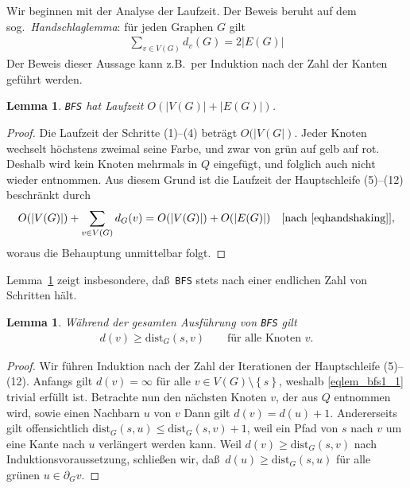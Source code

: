 \documentclass[10pt,reqno]{amsart}
\numberwithin{equation}{section}
\newtheorem{lemma}[definition]{Lemma}
\newcommand\dist{\mathrm{dist}}
\newcommand\cbc[1]{\left\{{#1}\right\}}
\newcommand\Lem{Lemma}
\begin{document}
Wir beginnen mit der Analyse der Laufzeit.
Der Beweis beruht auf dem sog.\ {\em Handschlaglemma}: f\"ur jeden Graphen $G$ gilt
\begin{align}\label{eqhandshaking}
	\sum_{v\in V(G)}d_v(G)=2|E(G)|
\end{align}
Der Beweis dieser Aussage kann z.B.\ per Induktion nach der Zahl der Kanten gef\"uhrt werden.

\begin{lemma}\label{lem_bfs0}
	{\tt BFS} hat Laufzeit $O(|V(G)|+|E(G)|)$.
\end{lemma}
\begin{proof}
	Die Laufzeit der Schritte (1)--(4) betr\"agt $O(|V(G|)$.
	Jeder Knoten wechselt h\"ochstens zweimal seine Farbe, und zwar von gr\"un auf gelb auf rot.
	Deshalb wird kein Knoten mehrmals in $Q$ eingef\"ugt, und folglich auch nicht wieder entnommen.
	Aus diesem Grund ist die Laufzeit der Hauptschleife (5)--(12) beschr\"ankt durch
	\begin{align*}
		O(|V(G)|)+\sum_{v\in V(G)}d_G(v)=O(|V(G)|)+O(|E(G)|)&&[\mbox{nach \eqref{eqhandshaking}}],
	\end{align*}
	woraus die Behauptung unmittelbar folgt.
\end{proof}

\Lem~\ref{lem_bfs0} zeigt insbesondere, da\ss\ {\tt BFS} stets nach einer endlichen Zahl von Schritten h\"alt.

\begin{lemma}\label{lem_bfs1}
	W\"ahrend der gesamten Ausf\"uhrung von {\tt BFS} gilt 
	\begin{align}\label{eqlem_bfs1_1}
	d(v)\geq\dist_G(s,v)\qquad\mbox{f\"ur alle Knoten $v$}.
	\end{align}
\end{lemma}
\begin{proof}
	Wir f\"uhren Induktion nach der Zahl der Iterationen der Hauptschleife (5)--(12).
	Anfangs gilt $d(v)=\infty$ f\"ur alle $v\in V(G)\setminus\cbc s$, weshalb \eqref{eqlem_bfs1_1} trivial erf\"ullt ist.
	Betrachte nun den n\"achsten Knoten $v$, der aus $Q$ entnommen wird, sowie einen Nachbarn $u$ von $v$
	Dann gilt $d(v)=d(u)+1$.
	Andererseits gilt offensichtlich $\dist_G(s,u)\leq\dist_G(s,v)+1$, weil ein Pfad von $s$ nach $v$ um eine Kante nach $u$ verl\"angert werden kann.
	Weil $d(v)\geq\dist_G(s,v)$ nach Induktionsvoraussetzung, schlie\ss en wir, da\ss\ $d(u)\geq\dist_G(s,u)$ f\"ur alle gr\"unen $u\in\partial_Gv$.
\end{proof}
\end{document}
